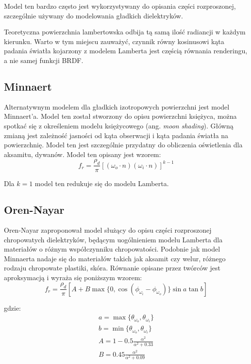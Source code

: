 \documentclass[../main.tex]{subfiles}
\begin{document}
Model ten bardzo często jest wykorzystywany do opisania części rozproszonej,
szczególnie używany do modelowania gładkich dielektryków.

Teoretyczna powierzchnia lambertowska odbija tą samą ilość radiancji w każdym
kierunku. Warto w tym miejscu zauważyć, czynnik równy kosinusowi kąta padania
światła kojarzony z modelem Lamberta jest częścią równania renderingu, a nie
samej funkcji BRDF.


\subsection{Minnaert}

Alternatywnym modelem dla gładkich izotropowych powierzchni jest model
Minnaert'a. Model ten został stworzony do opisu powierzchni księżyca, można
spotkać się z określeniem modelu księżycowego (ang. \textit{moon shading}).
Główną zmianą jest zależność jasności od kąta obserwacji i kąta padania światła
na powierzchnię.  Model ten jest szczególnie przydatny do obliczenia
oświetlenia dla aksamitu, dywanów. Model ten opisany jest wzorem:
\[
  f_r = \frac{\rho_d}{\pi} \left[
    (\omega_o \cdot n) (\omega_i \cdot n)
  \right]^{k-1}
\]

Dla $k=1$ model ten redukuje się do modelu Lamberta.


\subsection{Oren-Nayar}

Oren-Nayar zaproponował model służący do opisu części rozproszonej chropowatych
dielektryków, będącym uogólnieniem modelu Lamberta dla materiałów o różnym
współczynniku chropowatości. Podobnie jak model Minnaerta nadaje się do
materiałów takich jak aksamit czy welur, różnego rodzaju chropowate plastiki,
skóra. Równanie opisane przez twórców jest aproksymacją i wyraża się poniższym
wzorem:
\[
  f_r = \frac{\rho_d}{\pi} \left[
    A +
    B
      \max\{ 0, \cos\left(\phi_{\omega_i} - \phi_{\omega_o}\right) \}
      \sin a \tan b
  \right]
\]


\noindent gdzie:
\begin{gather*}
  a = \max \{ \theta_{\omega_o}, \theta_{\omega_i} \} \\
  b = \min \{ \theta_{\omega_o}, \theta_{\omega_i} \} \\
  A = 1 - 0.5 \frac{\alpha^2}{\alpha^2 + 0.33} \\
  B = 0.45 \frac{\alpha^2}{\alpha^2 + 0.09}
\end{gather*}
\end{document}

